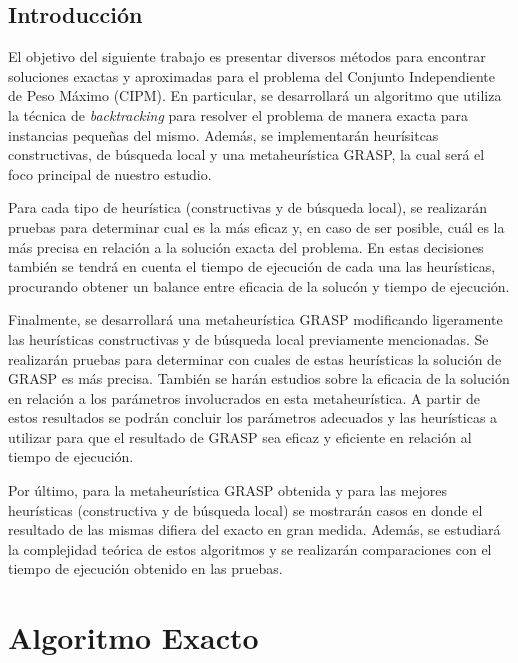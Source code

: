 \documentclass[a4paper,11pt] {article}
\begin{document}
\begin{center}
\section*{Introducci\'on}
\end{center}

El objetivo del siguiente trabajo es presentar diversos m\'etodos para encontrar soluciones exactas y aproximadas para el problema del Conjunto Independiente de Peso M\'aximo (CIPM). En particular, se desarrollar\'a un algoritmo que utiliza la t\'ecnica de \textit{backtracking} para resolver el problema de manera exacta para instancias peque\~{n}as del mismo. Adem\'as, se implementar\'an heur\'isitcas constructivas, de b\'usqueda local y una metaheur\'istica GRASP, la cual ser\'a el foco principal de nuestro estudio.

Para cada tipo de heur\'istica (constructivas y de b\'usqueda local), se realizar\'an pruebas para determinar cual es la m\'as eficaz y, en caso de ser posible, cu\'al es la m\'as precisa en relaci\'on a la soluci\'on exacta del problema. En estas decisiones tambi\'en se tendr\'a en cuenta el tiempo de ejecuci\'on de cada una las heur\'isticas, procurando obtener un balance entre eficacia de la soluc\'on y tiempo de ejecuci\'on.

Finalmente, se desarrollar\'a una metaheur\'istica GRASP modificando ligeramente las heur\'isticas constructivas y de b\'usqueda local previamente mencionadas. Se realizar\'an pruebas para determinar con cuales de estas heur\'isticas la soluci\'on de GRASP es m\'as precisa. Tambi\'en se har\'an estudios sobre la eficacia de la soluci\'on en relaci\'on a los par\'ametros involucrados en esta metaheur\'istica. A partir de estos resultados se podr\'an concluir los par\'ametros adecuados y las heur\'isticas a utilizar para que el resultado de GRASP sea eficaz y eficiente en relaci\'on al tiempo de ejecuci\'on.

Por \'ultimo, para la metaheur\'istica GRASP obtenida y para las mejores heur\'isticas (constructiva y de b\'usqueda local) se mostrar\'an casos en donde el resultado de las mismas difiera del exacto en gran medida. Adem\'as, se estudiar\'a la complejidad te\'orica de estos algoritmos y se realizar\'an comparaciones con el tiempo de ejecuci\'on obtenido en las pruebas.

\section*{Algoritmo Exacto}
\end{document}
